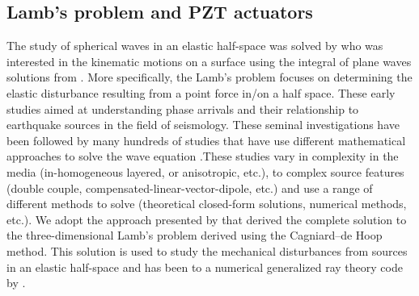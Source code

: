 \documentclass[preprint,3p, 11pt,authoryear]{elsarticle}
\begin{document}
\subsection{Lamb's problem and PZT actuators}

The study of spherical waves in an elastic half-space was solved by \citet{Lamb1904} who was interested in the kinematic motions on a surface using the integral of plane waves solutions from \citet{Rayleigh1988}. More specifically, the Lamb's problem focuses on determining the elastic disturbance resulting from a point force in/on a half space. These early studies aimed at understanding phase arrivals and their relationship to earthquake sources in the field of seismology. These seminal investigations have been followed by many hundreds of studies that have use different mathematical approaches to solve the wave equation \citep[e.g. ch 6 in][]{Aki2002}.These studies vary in complexity in the media (in-homogeneous layered, or anisotropic, etc.), to complex source features (double couple, compensated-linear-vector-dipole, etc.) and use a range of different methods to solve (theoretical closed-form solutions, numerical methods, etc.). We adopt the approach presented by \citet{Johnson1974} that derived the complete solution to the three-dimensional Lamb’s problem derived using the Cagniard--de Hoop method. This solution is used to study the mechanical disturbances from sources in an elastic half-space and has been to a numerical generalized ray theory code by \citet{Hsu1985} \citep[see also][]{McLaskey2011, McLaskey2012, Selvadurai2019}.
\end{document}
